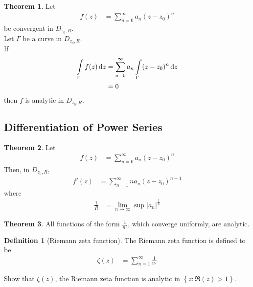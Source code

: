 \documentclass[titlepage, fleqn, a4paper, 12pt, twoside]{article}
\theoremstyle{definition}
\newtheorem{definition}{Definition}
\theoremstyle{theorem}
\newtheorem{theorem}{Theorem}
\begin{document}
\begin{theorem}
	Let
	\begin{align*}
		f(z) & = \sum\limits_{n = 0}^{\infty} a_n (z - z_0)^n
	\end{align*}
	be convergent in $D_{z_0,R}$.\\
	Let $\Gamma$ be a curve in $D_{z_0,R}$.\\
	If
	\begin{align*}
		\int\limits_{\Gamma} f(z) \dif z & = \sum\limits_{n = 0}^{\infty} a_n \int\limits_{\Gamma} (z - z_0)^n \dif z \\
                                                 & = 0
	\end{align*}
	then $f$ is analytic in $D_{z_0,R}$.
\end{theorem}

\subsection{Differentiation of Power Series}

\begin{theorem}
	Let
	\begin{align*}
		f(z) & = \sum\limits_{n = 0}^{\infty} a_n (z - z_0)^n
	\end{align*}
	Then, in $D_{z_0,R}$,
	\begin{align*}
		f'(z) & = \sum\limits_{n = 1}^{\infty} n a_n (z - z_0)^{n - 1}
	\end{align*}
	where
	\begin{align*}
		\frac{1}{R} & = \lim\limits_{n \to \infty} \sup |a_n|^{\frac{1}{n}}
	\end{align*}
\end{theorem}

\begin{theorem}
	All functions of the form $\frac{1}{n^z}$, which converge uniformly, are analytic.
\end{theorem}

\begin{definition}[Riemann zeta function]
	The Riemann zeta function is defined to be
	\begin{align*}
		\zeta(z) & = \sum\limits_{n = 1}^{\infty} \frac{1}{n^z}
	\end{align*}
\end{definition}

\begin{question}
	Show that $\zeta(z)$, the Riemann zeta function is analytic in $\left\{ z : \Re(z) > 1 \right\}$.
\end{question}
\end{document}
